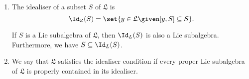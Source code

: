 \begin{enumerate}[label=(\alph*)]
	\item The idealiser of a subset $S$ of $\mathfrak{L}$ is
		\[ \Id_{\mathfrak{L}}(S) = \set{y \in \mathfrak{L}\given [y, S] \subseteq S}. \]

		If $S$ is a Lie subalgebra of $\mathfrak{L}$, then $\Id_L(S)$ is also
		a Lie subalgebra. Furthermore, we have $S \subseteq \Id_L(S)$.

	\item We say that $\mathfrak{L}$ satisfies the idealiser condition if every
		proper Lie subalgebra of $\mathfrak{L}$ is properly contained in its
		idealiser.
\end{enumerate}
